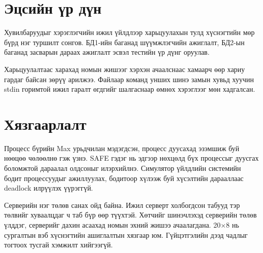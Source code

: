\section{Эцсийн үр дүн}
Хувилбаруудыг хэрэглэгчийн ижил үйлдлээр харьцуулахын тулд хүснэгтийн мөр бүрд нэг туршилт сонгов. БД1-ийн баганад шүүмжлэгчийн ажиглалт, БД2-ын баганад засварын дараах ажиглалт эсвэл тестийн үр дүнг оруулав.


Харьцуулалтаас харахад номын жишээг хэрхэн ачаалснаас хамаарч өөр хариу гардаг байсан зөрүү арилжээ. Файлаар команд унших шинэ замын хувьд хуучин stdin горимтой ижил гаралт өгдгийг шалгаснаар өмнөх хэрэглээг мөн хадгалсан.

\section{Хязгаарлалт}
 Процесс бүрийн Max урьдчилан мэдэгдсэн, процесс дуусахад эзэмшиж буй нөөцөө чөлөөлнө гэж үзнэ. SAFE гэдэг нь эдгээр нөхцөлд бүх процессыг дуусгах боломжтой дараалал олдсоныг илэрхийлнэ. Симулятор үйлдлийн системийн бодит процессуудыг ажиллуулах, бодитоор хүлээж буй хүсэлтийн дарааллаас deadlock илрүүлэх үүрэггүй.

 Серверийн нэг төлөв санах ойд байна. Ижил серверт холбогдсон табууд тэр төлвийг хуваалцдаг ч таб бүр өөр түүхтэй. Хөтчийг шинэчлэхэд серверийн төлөв үлддэг, серверийг дахин асаахад номын эхний жишээ ачаалагдана. 20×8 нь сургалтын вэб хүснэгтийн ашиглалтын хязгаар юм. Гүйцэтгэлийн дээд чадлыг тогтоох тусгай хэмжилт хийгээгүй.

